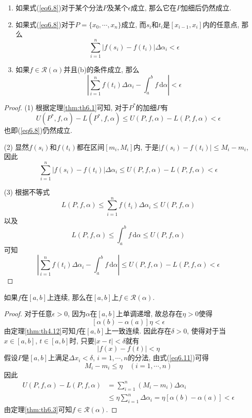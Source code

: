 \documentclass[cn,12pt,math=mtpro2,citestyle=gb7714-2015,bibstyle=gb7714-2015,twocol]{elegantbook}
\newcommand{\da}{\,\text{d}\alpha}
\begin{document}
\begin{theorem}\label{thm:th6.4}
  \begin{enumerate}[label=(\arabic*)]
  \item 如果式(\ref{eq6.8})对于某个分法$P$及某个$\epsilon$成立, 那么它在$P$加细后仍然成立.

  \item 如果式(\ref{eq6.8})对于$P=\{x_0,\cdots,x_n\}$成立, 而$s_i$和$t_i$是$[x_{i-1},x_i]$内的任意点, 那么
  $$\sum_{i=1}^{n}|f(s_i)-f(t_i)|\Delta\alpha_i<\epsilon$$

  \item 如果$f\in\mathscr{R}(\alpha)$并且(b)的条件成立, 那么
  $$\left|\sum_{i=1}^{n}f(t_i)\Delta\alpha_i-\int_{a}^{b}f\da\right|<\epsilon$$
  \end{enumerate}
\end{theorem}
\begin{proof}
  (1) 根据定理\ref{thm:th6.1}可知, 对于$P^\ast$的加细$P$有
  $$U(P^\ast,f,\alpha)-L(P^\ast,f,\alpha)\leq U(P,f,\alpha)-L(P,f,\alpha)<\epsilon$$
  也即(\ref{eq6.8})仍然成立.

  (2) 显然$f(s_i)$和$f(t_i)$都在区间$[m_i,M_i]$内, 于是$|f(s_i)-f(t_i)|\leq M_i-m_i$, 因此
  $$\sum_{i=1}^{n}|f(s_i)-f(t_i)|\Delta\alpha_i\leq U(P,f,\alpha)-L(P,f,\alpha)<\epsilon$$

  (3) 根据不等式
  $$L(P,f,\alpha)\leq\sum_{i=1}^{n}f(t_i)\Delta\alpha_i\leq U(P,f,\alpha)$$
  以及
  $$L(P,f,\alpha)\leq\int_a^b f\da\leq U(P,f,\alpha)$$
  可知
  $$\left|\sum_{i=1}^{n}f(t_i)\Delta\alpha_i-\int_{a}^{b}f\da\right|\leq U(P,f,\alpha)-L(P,f,\alpha)<\epsilon$$

\end{proof}
\begin{theorem}\label{thm:th6.10}
  如果$f$在$[a,b]$上连续, 那么在$[a,b]$上$f\in\mathscr{R}(\alpha)$.
\end{theorem}
\begin{proof}
  对于任意$\epsilon>0$, 因为$\alpha$在$[a,b]$上单调递增, 故总存在$\eta>0$使得
  $$[\alpha(b)-\alpha(a)]\eta<\epsilon$$
  由定理\ref{thm:th4.12}可知$f$在$[a,b]$上一致连续. 因此存在$\delta>0$, 使得对于当$x\in[a,b]$, $t\in[a,b]$时, 只要$|x-t|<\delta$就有
  \begin{equation}\label{eq6.11}
    |f(x)-f(t)|<\eta
  \end{equation}
  假设$P$是$[a,b]$上满足$\Delta x_i<\delta$, $i=1,\cdots,n$的分法, 由式(\ref{eq6.11})可得
  $$M_i-m_i\leq\eta\quad (i=1,\cdots,n)$$
  因此
  \begin{align*}
  U(P,f,\alpha)-L(P,f,\alpha)&=\sum_{i=1}^{n}(M_i-m_i)\Delta\alpha_i \\
  &\leq\eta\sum_{i=1}^{n}\Delta\alpha_i=\eta[\alpha(b)-\alpha(a)]<\epsilon
  \end{align*}
  由定理\ref{thm:th6.3}可知$f\in\mathscr{R}(\alpha)$.
\end{proof}
\end{document}
